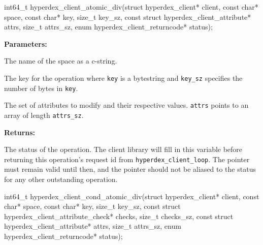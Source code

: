 \funcsep
\begin{ccode}
int64_t hyperdex_client_atomic_div(struct hyperdex_client* client,
                const char* space,
                const char* key, size_t key_sz,
                const struct hyperdex_client_attribute* attrs, size_t attrs_sz,
                enum hyperdex_client_returncode* status);
\end{ccode}
\funcdesc 

\noindent\textbf{Parameters:}
\begin{description}[labelindent=\widthof{{\texttt{attrs}, \texttt{attrs\_sz}}},leftmargin=*,noitemsep,nolistsep,align=right]
\item[\texttt{space}] The name of the space as a c-string.
\item[\texttt{key}, \texttt{key\_sz}] The key for the operation where \texttt{key} is a bytestring and \texttt{key\_sz} specifies the number of bytes in \texttt{key}.
\item[\texttt{attrs}, \texttt{attrs\_sz}] The set of attributes to modify and their respective values.  \texttt{attrs} points to an array of length \texttt{attrs\_sz}.
\end{description}

\noindent\textbf{Returns:}
\begin{description}[labelindent=\widthof{{\texttt{status}}},leftmargin=*,noitemsep,nolistsep,align=right]
\item[\texttt{status}] The status of the operation.  The client library will fill in this variable before returning this operation's request id from \texttt{hyperdex\_client\_loop}.  The pointer must remain valid until then, and the pointer should not be aliased to the status for any other outstanding operation.
\end{description}

\funcsep
\begin{ccode}
int64_t hyperdex_client_cond_atomic_div(struct hyperdex_client* client,
                const char* space,
                const char* key, size_t key_sz,
                const struct hyperdex_client_attribute_check* checks, size_t checks_sz,
                const struct hyperdex_client_attribute* attrs, size_t attrs_sz,
                enum hyperdex_client_returncode* status);
\end{ccode}
\funcdesc 

